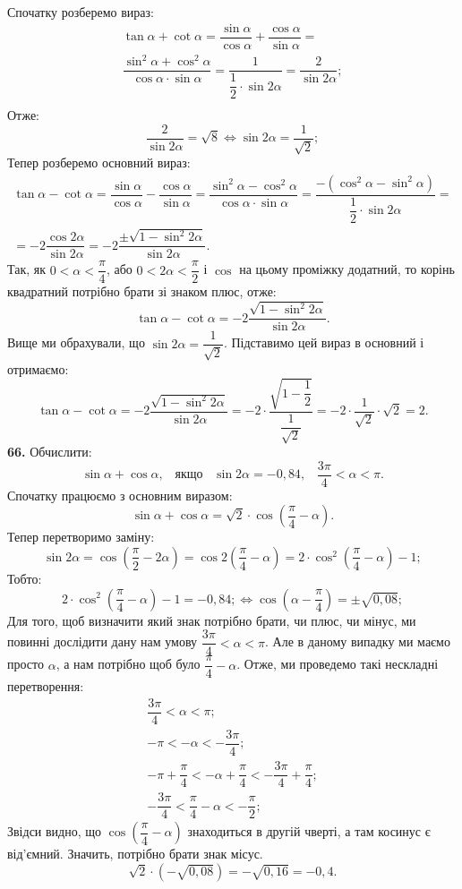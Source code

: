 Спочатку розберемо вираз:
\begin{gather*}
\tan\alpha+\cot\alpha=
\dfrac{\sin\alpha}{\cos\alpha}+\dfrac{\cos\alpha}{\sin\alpha}=\\
\dfrac{\sin^2\alpha+\cos^2\alpha}{\cos\alpha\cdot\sin\alpha}=
\dfrac{1}{\dfrac{1}{2}\cdot\sin2\alpha}=
\dfrac{2}{\sin2\alpha};\\
\end{gather*}
Отже:
$$
\dfrac{2}{\sin2\alpha}=\sqrt{8}\Leftrightarrow\sin2\alpha=\dfrac{1}{\sqrt{2}};
$$
Тепер розберемо основний вираз:
\begin{gather*}
\tan\alpha-\cot\alpha=
\dfrac{\sin\alpha}{\cos\alpha}-\dfrac{\cos\alpha}{\sin\alpha}=
\dfrac{\sin^2\alpha-\cos^2\alpha}{\cos\alpha\cdot\sin\alpha}=
\dfrac{-(\cos^2\alpha-\sin^2\alpha)}{\dfrac{1}{2}\cdot\sin2\alpha}=\\
=-2\dfrac{\cos2\alpha}{\sin2\alpha}=
-2\dfrac{\pm\sqrt{1-\sin^2 2\alpha}}{\sin2\alpha}.
\end{gather*}
Так, як $0<\alpha<\dfrac{\pi}{4}$, або $0<2\alpha<\dfrac{\pi}{2}$ і $\cos$ на цьому проміжку додатний, то корінь квадратний потрібно брати зі знаком плюс, отже:
$$
\tan\alpha-\cot\alpha=
-2\dfrac{\sqrt{1-\sin^2 2\alpha}}{\sin2\alpha}.
$$
Вище ми обрахували, що $\sin2\alpha=\dfrac{1}{\sqrt{2}}$. Підставимо цей вираз в основний і отримаємо:
$$
\tan\alpha-\cot\alpha=
-2\dfrac{\sqrt{1-\sin^2 2\alpha}}{\sin2\alpha}=
-2\cdot\dfrac{\sqrt{1-\dfrac{1}{2}}}{\dfrac{1}{\sqrt{2}}}=-2\cdot\dfrac{1}{\sqrt{2}}\cdot\sqrt{2}=2.
$$
\textbf{66.} Обчислити:
$$
\sin\alpha+\cos\alpha, \;\;\; \mbox{якщо} \;\;\; \sin2\alpha=-0,84, \;\;\; \dfrac{3\pi}{4}<\alpha<\pi.
$$
Спочатку працюємо з основним виразом:
$$
\sin\alpha+\cos\alpha=\sqrt{2}\cdot\cos\left(\dfrac{\pi}{4}-\alpha\right).
$$
Тепер перетворимо заміну:
$$
\sin2\alpha=\cos\left(\dfrac{\pi}{2}-2\alpha\right)=\cos2\left(\dfrac{\pi}{4}-\alpha\right)=
2\cdot\cos^2\left(\dfrac{\pi}{4}-\alpha\right)-1;
$$
Тобто:
$$
2\cdot\cos^2\left(\dfrac{\pi}{4}-\alpha\right)-1=-0,84;
\Leftrightarrow
\cos\left(\alpha-\dfrac{\pi}{4}\right)=\pm\sqrt{0,08};
$$
Для того, щоб визначити який знак потрібно брати, чи плюс, чи мінус, ми повинні дослідити дану нам умову $\dfrac{3\pi}{4}<\alpha<\pi$. Але в даному випадку ми маємо просто $\alpha$, а нам потрібно щоб було $\dfrac{\pi}{4}-\alpha$. Отже, ми проведемо такі нескладні перетворення:
\begin{gather*}
\dfrac{3\pi}{4}<\alpha<\pi;\\
-\pi<-\alpha<-\dfrac{3\pi}{4};\\
-\pi+\dfrac{\pi}{4}<-\alpha+\dfrac{\pi}{4}<-\dfrac{3\pi}{4}+\dfrac{\pi}{4};\\
-\dfrac{3\pi}{4}<\dfrac{\pi}{4}-\alpha<-\dfrac{\pi}{2};
\end{gather*}
Звідси видно, що $\cos\left(\dfrac{\pi}{4}-\alpha\right)$ знаходиться в другій чверті, а там косинус є від'ємний. Значить, потрібно брати знак місус.
$$
\sqrt{2}\cdot\left(-\sqrt{0,08}\right)=-\sqrt{0,16}=-0,4.
$$
